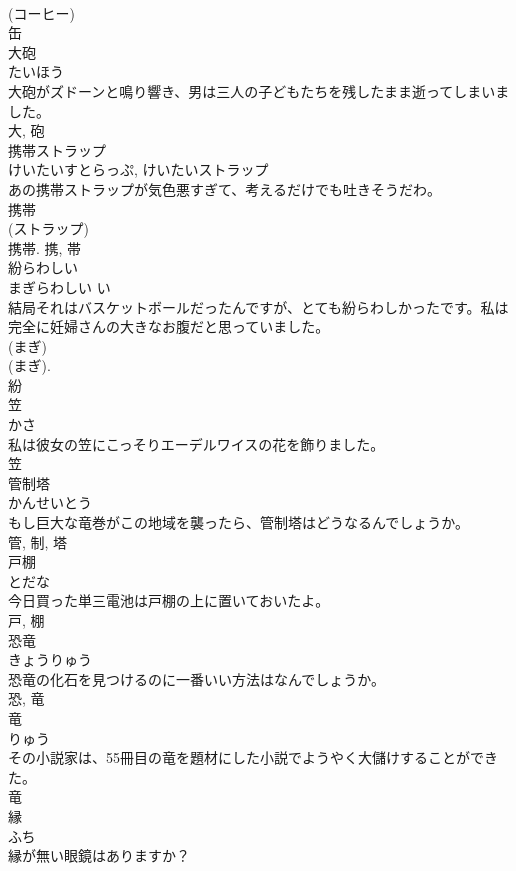 \documentclass[8pt]{extreport}
\begin{document}
\begin{CJK}{UTF8}{min}
\\	(コーヒー) 
\\	缶	
\\	大砲	
\\	たいほう	
\\	大砲がズドーンと鳴り響き、男は三人の子どもたちを残したまま逝ってしまいました。	
\\	大, 砲	
\\	携帯ストラップ	
\\	けいたいすとらっぷ, けいたいストラップ	
\\	あの携帯ストラップが気色悪すぎて、考えるだけでも吐きそうだわ。	
\\	携帯 
\\	(ストラップ) 
\\	携帯.	携, 帯	
\\	紛らわしい	
\\	まぎらわしい	い 
\\	結局それはバスケットボールだったんですが、とても紛らわしかったです。私は完全に妊婦さんの大きなお腹だと思っていました。	
\\	(まぎ) 
\\	(まぎ). 
\\	紛	
\\	笠	
\\	かさ	
\\	私は彼女の笠にこっそりエーデルワイスの花を飾りました。	
\\	笠	
\\	管制塔	
\\	かんせいとう	
\\	もし巨大な竜巻がこの地域を襲ったら、管制塔はどうなるんでしょうか。	
\\	管, 制, 塔	
\\	戸棚	
\\	とだな	
\\	今日買った単三電池は戸棚の上に置いておいたよ。	
\\	戸, 棚	
\\	恐竜	
\\	きょうりゅう	
\\	恐竜の化石を見つけるのに一番いい方法はなんでしょうか。	
\\	恐, 竜	
\\	竜	
\\	りゅう	
\\	その小説家は、55冊目の竜を題材にした小説でようやく大儲けすることができた。	
\\	竜	
\\	縁	
\\	ふち	
\\	縁が無い眼鏡はありますか？	

\end{CJK}
\end{document}
